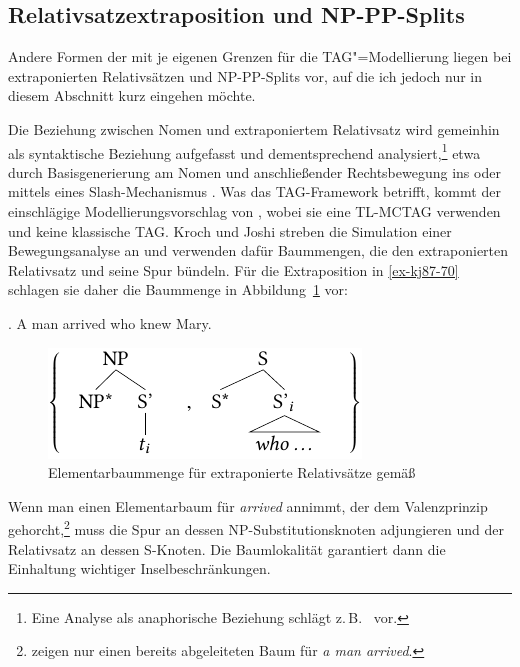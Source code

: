 \subsection{Relativsatzextraposition und NP-PP-Splits} \label{sec-tag-grenzen-wellnest}

Andere Formen der  mit je eigenen Grenzen für die TAG"=Modellierung liegen bei extraponierten Relativsätzen und NP-PP-Splits vor, auf die ich jedoch nur in diesem Abschnitt kurz eingehen möchte. %

Die Beziehung zwischen Nomen und extraponiertem Relativsatz wird gemeinhin als syntaktische Beziehung aufgefasst und dementsprechend analysiert,\footnote{Eine Analyse als anaphorische Beziehung schlägt z.\,B.\ \cite{Kiss:05} vor.} etwa durch Basisgenerierung am Nomen und anschlie\ss ender Rechtsbewegung ins  \citep{Buering:Hartmann:97} oder mittels eines Slash-Mechanismus \citep{Pollard:Sag:94, Keller:95, Mueller:99}. Was das TAG-Framework betrifft, kommt der einschlägige Modellierungsvorschlag von \cite{Kroch:Joshi:87}, wobei sie eine TL-MCTAG verwenden und keine klassische TAG. Kroch und Joshi streben die Simulation einer Bewegungsanalyse an und verwenden dafür Baummengen, die den extraponierten Relativsatz und seine Spur bündeln. Für die Extraposition in \ref{ex-kj87-70} schlagen sie daher die Baummenge in Abbildung~\ref{fig-kj87-1} vor: 

\ex. \label{ex-kj87-70} A man arrived who knew Mary. \hfill \citep[(70)]{Kroch:Joshi:87}

\begin{figure}[t]
\centering
\includegraphics{graphics/abb517.pdf}
\caption{\label{fig-kj87-1}Elementarbaummenge für extraponierte Relativsätze gemä\ss\ \cite{Kroch:Joshi:87}}
\end{figure}
Wenn man einen Elementarbaum für {\it arrived} annimmt, der dem Valenzprinzip gehorcht,\footnote{\citet[(71)]{Kroch:Joshi:87} zeigen nur einen bereits abgeleiteten Baum für {\it a man arrived}.} muss die Spur an dessen NP-Substitutionsknoten adjungieren und der Relativsatz an dessen S-Knoten. Die Baumlokalität garantiert dann die Einhaltung wichtiger Inselbeschränkungen.  

